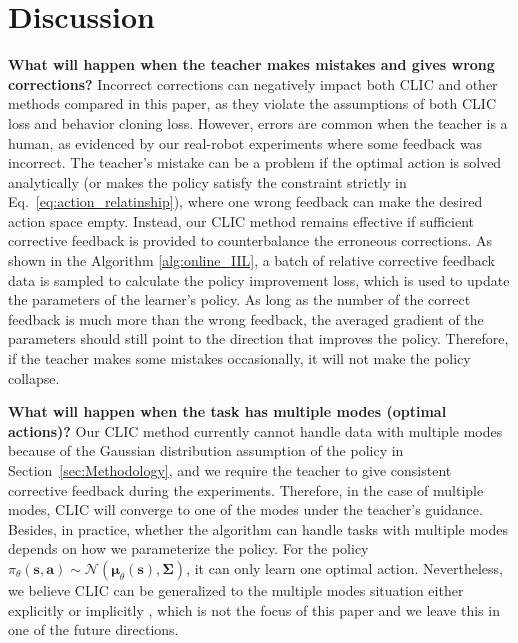 \section{Discussion}
\label{sec:discussion}
\textbf{What will happen when the teacher makes mistakes and gives wrong corrections?}
Incorrect corrections can negatively impact both CLIC and other methods compared in this paper, as they violate the assumptions of both CLIC loss and behavior cloning loss. 
However, errors are common when the teacher is a human, as evidenced by our real-robot experiments where some feedback was incorrect. 
 The teacher's mistake can be a problem if the optimal action is solved analytically (or makes the policy satisfy the constraint strictly in Eq.~\eqref{eq:action_relatinship}), where one wrong feedback can make the desired action space empty. 
Instead, our CLIC method remains effective if sufficient corrective feedback is provided to counterbalance the erroneous corrections.  
As shown in the Algorithm \ref{alg:online_IIL}, a batch of relative corrective feedback data is sampled to calculate the policy improvement loss, which is used to update the parameters of the learner's policy.
As long as the number of the correct feedback is much more than the wrong feedback, the averaged gradient of the parameters should still point to the direction that improves the policy.
Therefore, if the teacher makes some mistakes occasionally, it will not make the policy collapse.



\textbf{What will happen when the task has multiple modes (optimal actions)?}
Our CLIC method currently cannot handle data with multiple modes because of the Gaussian distribution assumption of the policy in Section~\ref{sec:Methodology}, and we require the teacher to give consistent corrective feedback during the experiments. 
Therefore, in the case of multiple modes, CLIC will converge to one of the modes under the teacher's guidance.
Besides, in practice, whether the algorithm can handle tasks with multiple modes depends on how we parameterize the policy. 
For the policy $\pi_{\theta}(\bm s,\bm a) \sim 
\mathcal{N}(\bm \mu_{\theta}(\bm s), \bm \Sigma)$, it can only learn one optimal action.
Nevertheless, we believe CLIC can be generalized to the multiple modes situation either explicitly \cite{2022_Behavior_transformer} or implicitly \cite{2022_implicit_BC}, which is not the focus of this paper and we leave this in one of the future directions.

